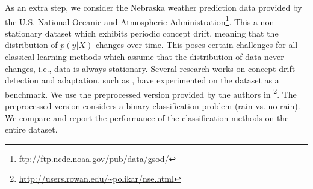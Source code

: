 As an extra step, we consider the Nebraska weather prediction data provided by the U.S. National Oceanic and Atmospheric Administration\footnote{\url{ftp://ftp.ncdc.noaa.gov/pub/data/gsod/}}. This a non-stationary dataset which exhibits periodic concept drift, meaning that the distribution of \(p(y|X)\) changes over time. This poses certain challenges for all classical learning methods which assume that the distribution of data never changes, i.e., data is always stationary. Several research works on concept drift detection and adaptation, such as \cite{elwellIncrementalLearningConcept2011}, have experimented on the dataset as a benchmark. We use the preprocessed version provided by the authors in \cite{elwellIncrementalLearningConcept2011}\footnote{\url{http://users.rowan.edu/~polikar/nse.html}}. The preprocessed version considers a binary classification problem (rain vs. no-rain). We compare and report the performance of the classification methods on the entire dataset.